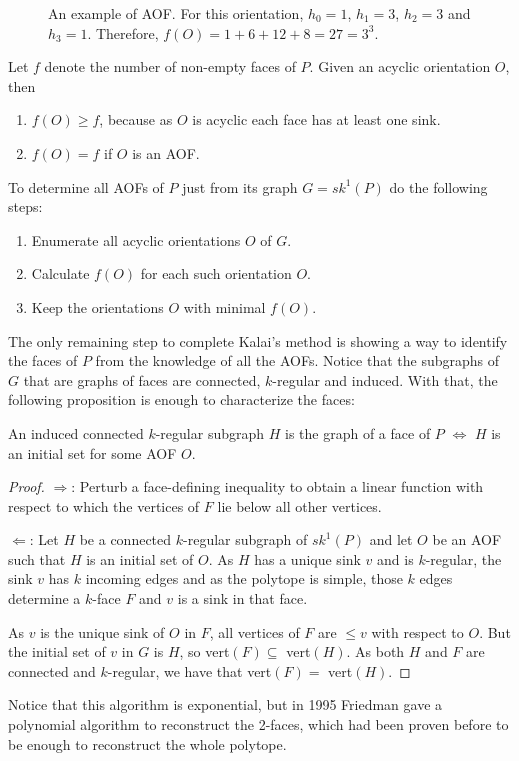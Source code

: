 \begin{figure}[!h]
\centering 
\centerline{}

\caption{An example of AOF. For this orientation, $h_0 = 1$, $h_1 = 3$, $h_2 = 3$ and $h_3 = 1$. Therefore, $f(O) = 1 + 6 + 12 + 8 = 27 = 3^3$.}
\end{figure}

Let $f$ denote the number of non-empty faces of $P$. Given an acyclic orientation $O$, then

\begin{enumerate}
\item $f(O) \geq f$, because as $O$ is acyclic each face has at least one sink.
\item $f(O) = f$ if $O$ is an AOF.
\end{enumerate}

To determine all AOFs of $P$ just from its graph $G = sk^1(P)$ do the following steps:
\begin{enumerate}
\item Enumerate all acyclic orientations $O$ of $G$.
\item Calculate $f(O)$ for each such orientation $O$.
\item Keep the orientations $O$ with minimal $f(O)$.
\end{enumerate}

The only remaining step to complete Kalai's method is showing a way to identify the faces of $P$ from the knowledge of all the AOFs. Notice that the subgraphs of $G$ that are graphs of faces are connected, $k$-regular and induced. With that, the following proposition is enough to characterize the faces:

\begin{proposition}
An induced connected $k$-regular subgraph $H$ is the graph of a face of $P$ $\Leftrightarrow$ $H$ is an initial set for some AOF $O$.
\end{proposition}
\begin{proof}

$\Rightarrow$: Perturb a face-defining inequality to obtain a linear function with respect to which the vertices of $F$ lie below all other vertices.

$\Leftarrow$: Let $H$ be a connected $k$-regular subgraph of $sk^1(P)$ and let $O$ be an AOF such that $H$ is an initial set of $O$. As $H$ has a unique sink $v$ and is $k$-regular, the sink $v$ has $k$ incoming edges and as the polytope is simple, those $k$ edges determine a $k$-face $F$ and $v$ is a sink in that face.

As $v$ is the unique sink of $O$ in $F$, all vertices of $F$ are $\leq v$ with respect to $O$. But the initial set of $v$ in $G$ is $H$, so vert$(F) \subseteq $ vert$(H)$. As both $H$ and $F$ are connected and $k$-regular, we have that vert$(F) = $ vert$(H)$.
\end{proof}

Notice that this algorithm is exponential, but in 1995 Friedman gave a polynomial algorithm to reconstruct the 2-faces, which had been proven before to be enough to reconstruct the whole polytope.
 

